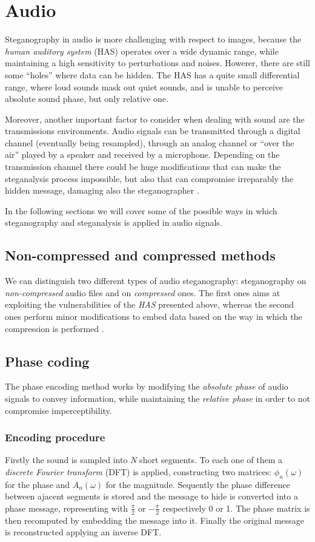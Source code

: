 \documentclass[../../main.tex]{subfiles}
\begin{document}
    

\section{Audio}
Steganography in audio is more challenging with respect to images, because
the \emph{human auditory system} (HAS) operates over a wide dynamic range,
while maintaining a high sensitivity to perturbations and noises.
Howerer, there are still some ``holes'' where data can be hidden.
The HAS has a quite small differential range, where loud sounds mask out quiet
sounds, and is unable to perceive absolute sound phase, but only
relative one.

Moreover, another important factor to consider when dealing with sound are the
transmissions environments.
Audio signals can be transmitted through a digital channel (eventually being
resampled), through an analog channel or ``over the air'' played by a
speaker and received by a microphone.
Depending on the transmission channel there could be huge modifications that
can make the steganalysis process impossible, but also that can compromise
irreparably the hidden message, damaging also the steganographer
\cite{techniques-data-hiding}.

In the following sections we will cover some of the possible ways in which
steganography and steganalysis is applied in audio signals.

\subsection{Non-compressed and compressed methods}
We can distinguish two different types of audio steganography: steganography
on \emph{non-compressed} audio files and on \emph{compressed} ones.
The first ones aims at exploiting the vulnerabilities of the \emph{HAS}
presented above, whereas the second ones perform minor modifications to
embed data based on the way in which the compression is performed
\cite{review-audio-steganalysis}.

\subsection{Phase coding}
The phase encoding method works by modifying the \emph{absolute phase} of
audio signals to convey information, while maintaining the \emph{relative
phase} in order to not compromise imperceptibility.

\subsubsection{Encoding procedure}
Firstly the sound is sampled into \emph{N} short segments. To each one of them 
a \emph{discrete Fourier transform} (DFT) is applied, constructing two matrices: $\phi_n(\omega)$ for the phase 
and  $A_n(\omega)$ for the magnitude. Sequently the phase difference between ajacent segments is stored and the message to hide 
is converted into a phase message, representing with $\frac{\pi}{2}$ or $-\frac{\pi}{2}$ respectively 0 or 1.
The phase matrix is then recomputed by embedding the message into it. Finally the original message is reconstructed applying an inverse DFT.
\end{document}
